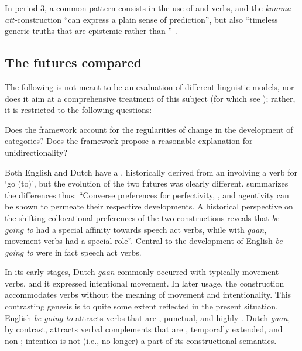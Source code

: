 \documentclass[output=paper]{langsci/langscibook}
\begin{document}
In period 3, a common pattern consists in the use of  and  verbs, and the \textit{komma att-}construction “can express a plain sense of prediction”, but also “timeless generic truths that are epistemic rather than ” \citep[130]{Hilpert2008}.  



\subsection{The futures compared}\label{sec:heine:3.4}



The following is not meant to be an evaluation of different linguistic models, nor does it aim at a comprehensive treatment of this subject (for which see \citealt{BörjarsVincent2011}); rather, it is restricted to the following questions:



\ea%
    \label{ex:heine:13}
\ea Does the framework account for the regularities of change in the development of  categories?
\ex Does the framework propose a reasonable explanation for unidirectionality?
\z
\z



Both English and Dutch have a , historically derived from an  involving a verb for ‘go (to)’, but the evolution of the two futures was clearly different. \citet[122]{Hilpert2008} summarizes the differences thus: “Converse preferences for perfectivity, , and agentivity can be shown to permeate their respective developments. A historical perspective on the shifting collocational preferences of the two constructions reveals that \textit{be going to} had a special affinity towards speech act verbs, while with \textit{gaan}, movement verbs had a special role”. Central to the development of English \textit{be going to} were in fact  speech act verbs.  



In its early stages, Dutch \textit{gaan} commonly occurred with typically  movement verbs, and it expressed intentional movement. In later usage, the construction accommodates verbs without the meaning of movement and intentionality. This contrasting genesis is to quite some extent reflected in the present situation. English \textit{be going to} attracts verbs that are , punctual, and highly  \citep[121--122]{Hilpert2008}. Dutch \textit{gaan}, by contrast, attracts verbal complements that are , temporally extended, and non-; intention is not (i.e., no longer) a part of its constructional semantics.
\end{document}
